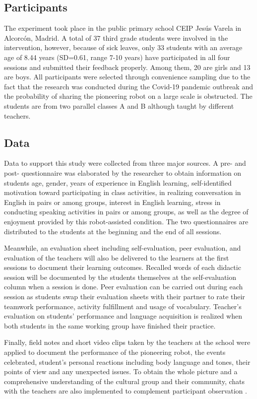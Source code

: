 \documentclass[english]{textolivre}
\begin{document}
\subsection{Participants}\label{sec-idioma}
The experiment took place in the public primary school CEIP Jesús Varela in Alcorcón, Madrid. A total of 37 third grade students were involved in the intervention, however, because of sick leaves, only 33 students with an average age of 8.44 years (SD=0.61, range 7-10 years) have participated in all four sessions and submitted their feedback properly. Among them, 20 are girls and 13 are boys. All participants were selected through convenience sampling due to the fact that the research was conducted during the Covid-19 pandemic outbreak and the probability of sharing the pioneering robot on a large scale is obstructed. The students are from two parallel classes A and B although taught by different teachers.

\subsection{Data}\label{sec-resumo}
Data to support this study were collected from three major sources. A pre- and post- questionnaire was elaborated by the researcher to obtain information on students age, gender, years of experience in English learning, self-identified motivation toward participating in class activities, in realizing conversation in English in pairs or among groups, interest in English learning, stress in conducting speaking activities in pairs or among groups, as well as the degree of enjoyment provided by this robot-assisted condition. The two questionnaires are distributed to the students at the beginning and the end of all sessions.

Meanwhile, an evaluation sheet including self-evaluation, peer evaluation, and evaluation of the teachers will also be delivered to the learners at the first sessions to document their learning outcomes. Recalled words of each didactic session will be documented by the students themselves at the self-evaluation column when a session is done. Peer evaluation can be carried out during each session as students swap their evaluation sheets with their partner to rate their teamwork performance, activity fulfillment and usage of vocabulary. Teacher’s evaluation on students’ performance and language acquisition is realized when both students in the same working group have finished their practice.

Finally, field notes and short video clips taken by the teachers at the school were applied to document the performance of the pioneering robot, the events celebrated, student’s personal reactions including body language and tones, their points of view and any unexpected issues. To obtain the whole picture and a comprehensive understanding of the cultural group and their community, chats with the teachers are also implemented to complement participant observation \cite{shin_review_2022}. 
\end{document}
